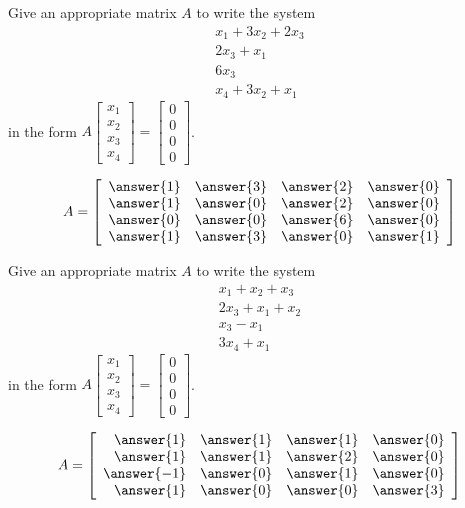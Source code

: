 \documentclass{ximera}
\begin{document}
\begin{problem}\label{prb:4.22} Give an appropriate matrix $A$ to write the system
\begin{equation*}
\begin{array}{c}
x_{1}+3x_{2}+2x_{3} \\
2x_{3}+x_{1} \\
6x_{3} \\
x_{4}+3x_{2}+x_{1}
\end{array}
\end{equation*}
 in the form $A\left[
\begin{array}{c}
x_{1} \\
x_{2} \\
x_{3} \\
x_{4}
\end{array}
\right] = \left[
\begin{array}{c}
0 \\
0 \\
0 \\
0
\end{array}
\right] $.

$$A=\left[
\begin{array}{rrrr}
\answer{1} & \answer{3} & \answer{2} & \answer{0} \\
\answer{1} & \answer{0} & \answer{2} & \answer{0} \\
\answer{0} & \answer{0} & \answer{6} & \answer{0} \\
\answer{1} & \answer{3} & \answer{0} & \answer{1}
\end{array}
\right] $$
\end{problem}

\begin{problem}\label{prb:4.23} Give an appropriate matrix $A$ to write the system
\begin{equation*}
\begin{array}{c}
x_{1}+x_{2}+x_{3} \\
2x_{3}+x_{1}+x_{2} \\
x_{3}-x_{1} \\
3x_{4}+x_{1}
\end{array}
\end{equation*}
 in the form $A\left[
\begin{array}{c}
x_{1} \\
x_{2} \\
x_{3} \\
x_{4}
\end{array}
\right] = \left[
\begin{array}{c}
0 \\
0 \\
0 \\
0
\end{array}
\right] $.

$$A=\left[
\begin{array}{rrrr}
\answer{1} & \answer{1} & \answer{1} & \answer{0} \\
\answer{1} & \answer{1} & \answer{2} & \answer{0} \\
\answer{-1} & \answer{0} & \answer{1} & \answer{0} \\
\answer{1} & \answer{0} & \answer{0} & \answer{3}
\end{array}
\right] $$
\end{problem}
\end{document}

